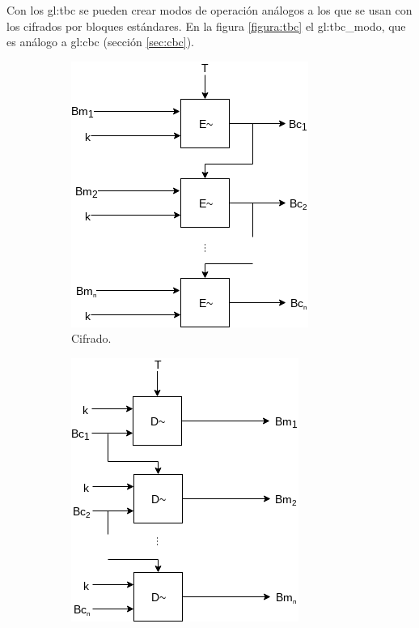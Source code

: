 
Con los \gls{gl:tbc} se pueden crear modos de operación análogos a los que se
usan con los cifrados por bloques estándares. En la figura \ref{figura:tbc}
el \gls{gl:tbc_modo}, que es análogo a \gls{gl:cbc} (sección \ref{sec:cbc}).

\begin{figure}
  \centering
  \begin{subfigure}{0.45\textwidth}
    \begin{center}
      \includegraphics[width=0.7\linewidth]{diagramas/tbc.png}
      \caption{Cifrado.}
    \end{center}
  \end{subfigure}
  \begin{subfigure}{0.45\textwidth}
    \begin{center}
      \includegraphics[width=0.7\linewidth]{diagramas/tbc_inverso.png}

\end{center}
\end{subfigure}
\end{figure}
